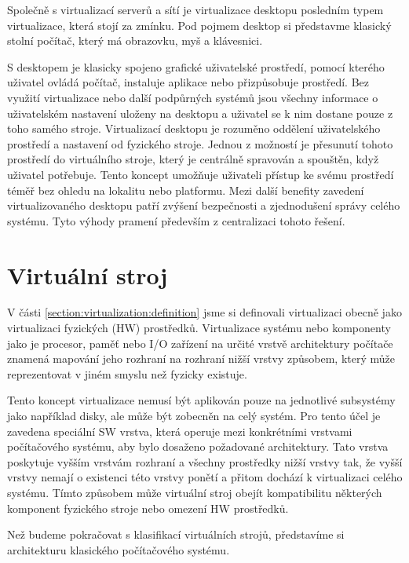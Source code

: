   Společně s virtualizací serverů a sítí je virtualizace desktopu posledním typem virtualizace, která stojí za zmínku. Pod pojmem desktop si představme klasický stolní počítač, který má obrazovku, myš a klávesnici.

  S desktopem je klasicky spojeno grafické uživatelské prostředí, pomocí kterého uživatel ovládá počítač, instaluje aplikace nebo přizpůsobuje prostředí. Bez využití virtualizace nebo další podpůrných systémů jsou 
  všechny informace o uživatelském nastavení uloženy na desktopu a uživatel se k nim dostane pouze z toho samého stroje. Virtualizací desktopu je rozuměno oddělení uživatelského prostředí a nastavení od fyzického
  stroje. Jednou z možností je přesunutí tohoto prostředí do virtuálního stroje, který je centrálně spravován a spouštěn, když uživatel potřebuje. Tento koncept umožňuje uživateli přístup ke svému prostředí téměř
  bez ohledu na lokalitu nebo platformu. Mezi další benefity zavedení virtualizovaného desktopu patří zvýšení bezpečnosti a zjednodušení správy celého systému. Tyto výhody pramení především z centralizaci tohoto
  řešení.
  

  
\section{Virtuální stroj}
\label{section:virtual_machine}

V části \ref{section:virtualization:definition} jsme si definovali virtualizaci obecně jako virtualizaci fyzických (HW) prostředků.  Virtualizace systému nebo komponenty jako je procesor, paměť nebo I/O zařízení na určité vrstvě
architektury počítače znamená mapování jeho rozhraní na rozhraní nižší vrstvy způsobem, který může reprezentovat v jiném smyslu než fyzicky existuje.

Tento koncept virtualizace nemusí být aplikován pouze na jednotlivé subsystémy jako například disky, ale může být zobecněn na celý systém. Pro tento účel je zavedena speciální SW vrstva, která operuje mezi konkrétními
vrstvami počítačového systému, aby bylo dosaženo požadované architektury. Tato vrstva poskytuje vyšším vrstvám rozhraní a všechny prostředky nižší vrstvy tak, že vyšší vrstvy nemají o existenci této vrstvy ponětí a přitom
dochází k virtualizaci celého systému. Tímto způsobem může virtuální stroj obejít kompatibilitu některých komponent fyzického stroje nebo omezení HW prostředků.

Než budeme pokračovat s klasifikací virtuálních strojů, představíme si architekturu klasického počítačového systému.

